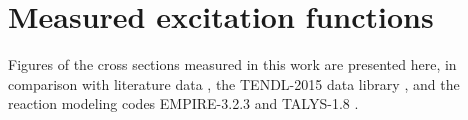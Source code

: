 \documentclass[3p]{elsarticle}
\newcommand{\comment}[1]{\todo[color=blue!20!white,inline]{ASV: #1}}
\begin{document}
% 
% 
\section{Measured excitation functions} \label{fit_figures}

Figures of the cross sections measured in this work are presented here, in comparison with literature data \cite{Albouy1963,PhysRev.162.1055,PhysRevC.6.1235,Grutter1982,Greenwood1984,Aleksandrov1987,levkovski1991cross,Mills1992,MICHEL1997153,Fassbender1997,Ido2002,sisterson2002selected,YashimaH2003,A2006,Ditroi2008,Ditroi2009,steyn2011excitation,Titarenko2011,Shahid2015,Garrido2016,Graves2016}, the TENDL-2015 data library \cite{Koning2012}, and the reaction modeling codes EMPIRE-3.2.3 and TALYS-1.8 \cite{Herman2007,Koning2012}.




\end{document}
